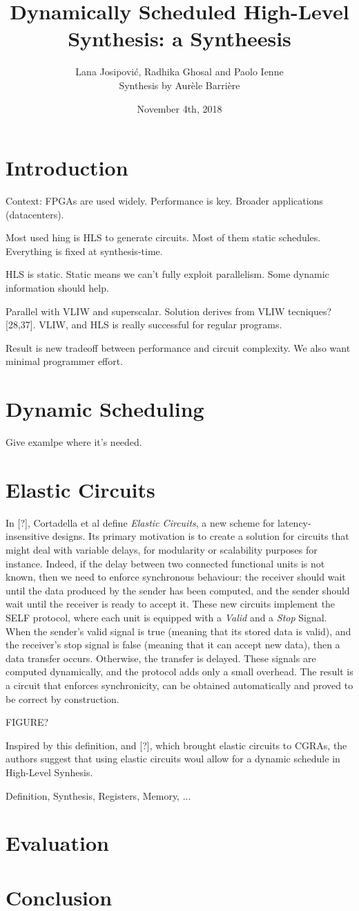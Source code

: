 \documentclass{article}
\title{Dynamically Scheduled High-Level Synthesis: a Syntheesis}
\author{Lana Josipovi\'c, Radhika Ghosal and Paolo Ienne\\ Synthesis by Aur\`ele Barri\`ere}
\date{November 4th, 2018}
\begin{document}
\maketitle

\section{Introduction}

Context: FPGAs are used widely. Performance is key.
Broader applications (datacenters).

Most used hing is HLS to generate circuits. Most of them static schedules.
Everything is fixed at synthesis-time.

HLS is static. Static means we can't fully exploit parallelism.
Some dynamic information should help.

Parallel with VLIW and superscalar. Solution derives from VLIW tecniques? [28,37].
VLIW, and HLS is really successful for regular programs.

Result is new tradeoff between performance and circuit complexity.
We also want minimal programmer effort.

\section{Dynamic Scheduling}
Give examlpe where it's needed.

\section{Elastic Circuits}

In [?], Cortadella et al define \textit{Elastic Circuits}, a new scheme for latency-insensitive designs.
Its primary motivation is to create a solution for circuits that might deal with variable delays, for modularity or scalability purposes for instance.
Indeed, if the delay between two connected functional units is not known, then we need to enforce synchronous behaviour: the receiver should wait until the data produced by the sender has been computed, and the sender should wait until the receiver is ready to accept it.
These new circuits implement the SELF protocol, where each unit is equipped with a \textit{Valid} and a \textit{Stop} Signal. When the sender's valid signal is true (meaning that its stored data is valid), and the receiver's stop signal is false (meaning that it can accept new data), then a data transfer occurs. Otherwise, the transfer is delayed. These signals are computed dynamically, and the protocol adds only a small overhead. The result is a circuit that enforces synchronicity, can be obtained automatically and proved to be correct by construction.

FIGURE?

Inspired by this definition, and [?], which brought elastic circuits to CGRAs, the authors suggest that using elastic circuits woul allow for a dynamic schedule in High-Level Synhesis.




Definition,
Synthesis,
Registers,
Memory, ...

\section{Evaluation}

\section{Conclusion}
\end{document}
